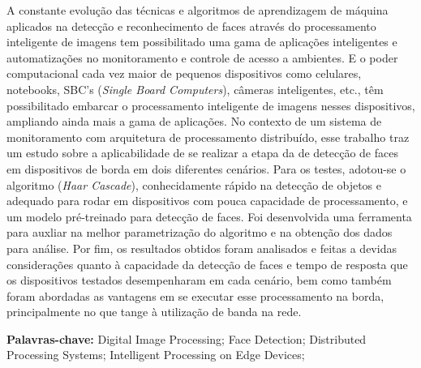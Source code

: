 \begin{resumo}

A constante evolução das técnicas e algoritmos de aprendizagem de máquina aplicados na detecção e reconhecimento de faces através do processamento inteligente de imagens tem possibilitado uma gama de aplicações inteligentes e automatizações no monitoramento e controle de acesso a ambientes. E o poder computacional cada vez maior de pequenos dispositivos como celulares, notebooks, SBC's (\textit{Single Board Computers}), câmeras inteligentes, etc., têm possibilitado embarcar o processamento inteligente de imagens nesses dispositivos, ampliando ainda mais a gama de aplicações. No contexto de um sistema de monitoramento com arquitetura de processamento distribuído, esse trabalho traz um estudo sobre a aplicabilidade de se realizar a etapa da de detecção de faces em dispositivos de borda em dois diferentes cenários. Para os testes, adotou-se o algoritmo (\textit{Haar Cascade}), conhecidamente rápido na detecção de objetos e adequado para rodar em dispositivos com pouca capacidade de processamento, e um modelo pré-treinado para detecção de faces. Foi desenvolvida uma ferramenta para auxliar na melhor parametrização do algoritmo e na obtenção dos dados para análise. Por fim, os resultados obtidos foram analisados e feitas a devidas considerações quanto à capacidade da detecção de faces e tempo de resposta que os dispositivos testados desempenharam em cada cenário, bem como também foram abordadas as vantagens em se executar esse processamento na borda, principalmente no que tange à utilização de banda na rede. 

\vspace{0.5cm}
 
 \textbf{Palavras-chave:} Digital Image Processing; Face Detection; Distributed Processing Systems; Intelligent Processing on Edge Devices;
\end{resumo}